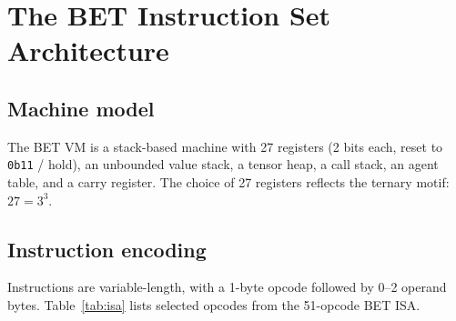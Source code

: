 \documentclass[journal,10pt,twocolumn]{IEEEtran}
\begin{document}
\section{The BET Instruction Set Architecture}
\label{sec:isa}

\subsection{Machine model}

The BET VM is a stack-based machine with 27 registers (2 bits each, reset to
\texttt{0b11} / hold), an unbounded value stack, a tensor heap, a call stack,
an agent table, and a carry register. The choice of 27 registers reflects the
ternary motif: $27 = 3^3$.

\subsection{Instruction encoding}

Instructions are variable-length, with a 1-byte opcode followed by 0--2
operand bytes. Table~\ref{tab:isa} lists selected opcodes from the 51-opcode
BET ISA.
\end{document}

